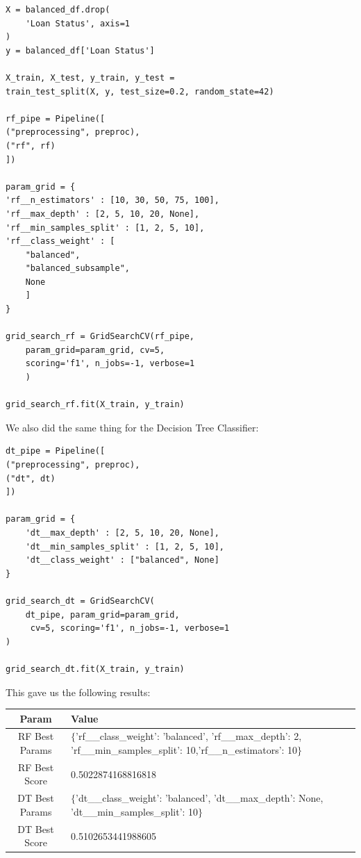 \documentclass[sigplan]{acmart}
\begin{document}
\begin{verbatim}
X = balanced_df.drop(
    'Loan Status', axis=1
)
y = balanced_df['Loan Status']

X_train, X_test, y_train, y_test = 
train_test_split(X, y, test_size=0.2, random_state=42)

rf_pipe = Pipeline([
("preprocessing", preproc),
("rf", rf)
])

param_grid = {
'rf__n_estimators' : [10, 30, 50, 75, 100],
'rf__max_depth' : [2, 5, 10, 20, None],
'rf__min_samples_split' : [1, 2, 5, 10],
'rf__class_weight' : [
    "balanced", 
    "balanced_subsample",
    None
    ]
}

grid_search_rf = GridSearchCV(rf_pipe, 
    param_grid=param_grid, cv=5, 
    scoring='f1', n_jobs=-1, verbose=1
    )

grid_search_rf.fit(X_train, y_train)
\end{verbatim}

We also did the same thing for the Decision Tree Classifier:
\begin{verbatim}
dt_pipe = Pipeline([
("preprocessing", preproc),
("dt", dt)
])

param_grid = {
    'dt__max_depth' : [2, 5, 10, 20, None],
    'dt__min_samples_split' : [1, 2, 5, 10],
    'dt__class_weight' : ["balanced", None]
}

grid_search_dt = GridSearchCV(
    dt_pipe, param_grid=param_grid,
     cv=5, scoring='f1', n_jobs=-1, verbose=1
)

grid_search_dt.fit(X_train, y_train)
\end{verbatim}

This gave us the following results:

\begin{table}[h]
    \centering
    \begin{tabular}{|c|p{4cm}|}
        \hline
        Param          & Value                                                                                                                       \\
        \hline
        RF Best Params & $\{$'rf\_\_class\_weight': 'balanced', 'rf\_\_max\_depth': 2, 'rf\_\_min\_samples\_split': 10,'rf\_\_n\_estimators': 10$\}$ \\
        \hline
        RF Best Score  & 0.5022874168816818                                                                                                          \\
        \hline
        DT Best Params & $\{$'dt\_\_class\_weight': 'balanced',
        'dt\_\_max\_depth': None,
        'dt\_\_min\_samples\_split': 10$\}$                                                                                                          \\
        \hline
        DT Best Score  & 0.5102653441988605                                                                                                          \\
        \hline
    \end{tabular}
\end{table}
\end{document}
